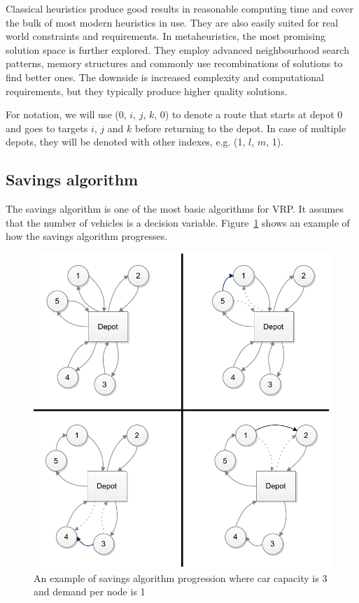 Classical heuristics produce good results in reasonable computing time and cover the bulk of most modern heuristics in use. They are also easily suited for real world constraints and requirements. In metaheuristics, the most promising solution space is further explored. They employ advanced neighbourhood search patterns, memory structures and commonly use recombinations of solutions to find better ones. The downside is increased complexity and computational requirements, but they typically produce higher quality solutions. \cite{laporte2000classical}

For notation, we will use (0, $i$, $j$, $k$, 0) to denote a route that starts at depot 0 and goes to targets $i$, $j$ and $k$ before returning to the depot. In case of multiple depots, they will be denoted with other indexes, e.g. (1, $l$, $m$, 1).



\subsection{Savings algorithm}

The savings algorithm is one of the most basic algorithms for VRP. It assumes that the number of vehicles is a decision variable. Figure~\ref{fig:savings1} shows an example of how the savings algorithm progresses.

\begin{figure}[h]
  \begin{center}
    \includegraphics{images/Savings1.pdf}
    \caption{An example of savings algorithm progression where car capacity is 3 and demand per node is 1}
    \label{fig:savings1}
  \end{center}
\end{figure}

